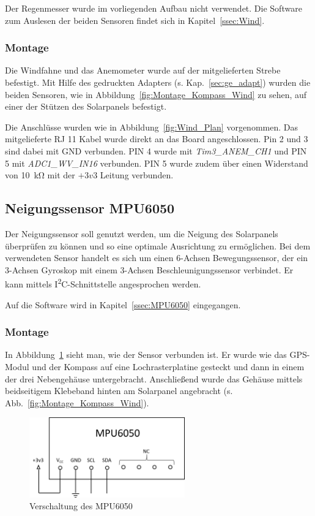 Der Regenmesser wurde im vorliegenden Aufbau nicht verwendet. Die Software zum Auslesen der beiden Sensoren findet sich in Kapitel~\ref{ssec:Wind}.

\subsubsection{Montage}
Die Windfahne und das Anemometer wurde auf der mitgelieferten Strebe befestigt. Mit Hilfe des gedruckten Adapters (s. Kap.~\ref{sec:ge_adapt}) wurden die beiden Sensoren, wie in Abbildung~\ref{fig:Montage_Kompass_Wind} zu sehen, auf einer der Stützen des Solarpanels befestigt.

Die Anschlüsse wurden wie in Abbildung~\ref{fig:Wind_Plan} vorgenommen. Das mitgelieferte RJ 11 Kabel wurde direkt an das Board angeschlossen. Pin 2 und 3 sind dabei mit GND verbunden. PIN 4 wurde mit \textit{Tim3\_ANEM\_CH1} und PIN 5 mit \textit{ADC1\_WV\_IN16} verbunden. PIN 5 wurde zudem über einen Widerstand von \SI{10}{\kilo\ohm} mit der $+3v3$ Leitung verbunden.

\subsection{Neigungssensor MPU6050}
Der Neigungssensor soll genutzt werden, um die Neigung des Solarpanels überprüfen zu können und so eine optimale Ausrichtung zu ermöglichen. Bei dem verwendeten Sensor handelt es sich um einen 6-Achsen Bewegungssensor, der ein 3-Achsen Gyroskop mit einem 3-Achsen Beschleunigungssensor verbindet. Er kann mittels I\textsuperscript{2}C-Schnittstelle angesprochen werden. \cite{ds_mpu6050}

Auf die Software wird in Kapitel~\ref{ssec:MPU6050} eingegangen.

\subsubsection{Montage}
In Abbildung~\ref{fig:MPU6050_Plan} sieht man, wie der Sensor verbunden ist. Er wurde wie das GPS-Modul und der Kompass auf eine Lochrasterplatine gesteckt und dann in einem der drei Nebengehäuse untergebracht. Anschließend wurde das Gehäuse mittels beidseitigem Klebeband hinten am Solarpanel angebracht (s. Abb.~\ref{fig:Montage_Kompass_Wind}).
\begin{figure}[H]
  \centering
  \includegraphics[width=0.6\textwidth]{./img/MPU6050_Plan.png}
  \caption{Verschaltung des MPU6050}\label{fig:MPU6050_Plan}
\end{figure}

